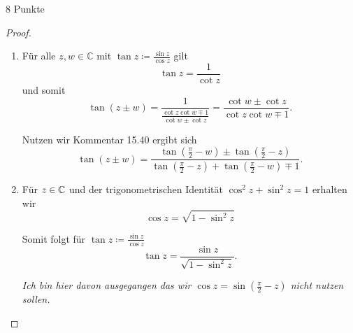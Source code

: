 \documentclass{problemset}
\begin{document}
\begin{problem}{8 Punkte}
\begin{proof}
\begin{enumerate}
		\item Für alle $z, w \in \mathbb{C}$ mit $\tan z \coloneqq \frac{\sin z}{\cos z}$ gilt
		      \[
			      \tan z = \frac{1}{\cot z}
		      \] und somit
		      \[
			      \tan (z \pm w) = \frac{1}{\frac{\cot z \cot w \mp 1}{\cot w \pm \cot z }} = \frac{\cot w \pm \cot z }{\cot z \cot w \mp 1}.
		      \]

		      Nutzen wir Kommentar 15.40  ergibt sich
		      \[
			      \tan (z \pm w) = \frac{ \tan (\frac{\pi}{2} - w) \pm \tan (\frac{\pi}{2} - z)}{\tan (\frac{\pi}{2} - z) + \tan (\frac{\pi}{2} - w) \mp 1}.
		      \]

		\item Für $z \in \mathbb{C}$ und der trigonometrischen Identität $\cos^2 z + \sin^2 z = 1$ erhalten wir \[
			      \cos z = \sqrt{ 1 - \sin^2 z }
		      \]

		      Somit folgt für $\tan z \coloneqq \frac{\sin z}{\cos z}$ \[
			      \tan z = \frac{\sin z}{\sqrt{1 - \sin^2 z}}.
		      \]

		      \textit{Ich bin hier davon ausgegangen das wir $\cos z = \sin (\frac{\pi}{2} - z)$ nicht nutzen sollen.}
	\end{enumerate}

\end{proof}

\end{problem}
\end{document}
